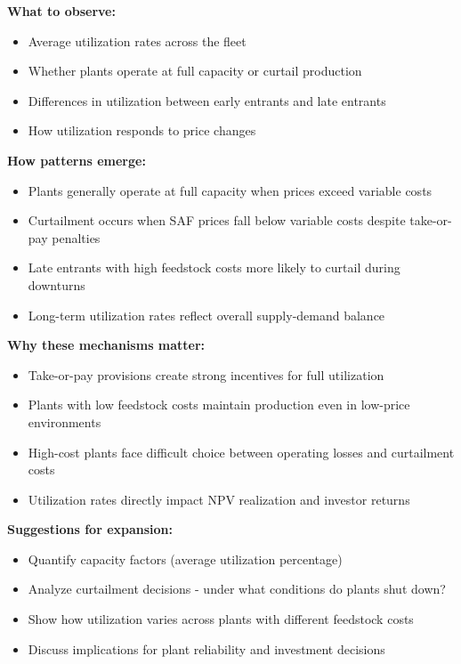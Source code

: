 \documentclass[10.5pt]{article}
\begin{document}
\textbf{What to observe:}
\begin{itemize}
    \item Average utilization rates across the fleet
    \item Whether plants operate at full capacity or curtail production
    \item Differences in utilization between early entrants and late entrants
    \item How utilization responds to price changes
\end{itemize}

\textbf{How patterns emerge:}
\begin{itemize}
    \item Plants generally operate at full capacity when prices exceed variable costs
    \item Curtailment occurs when SAF prices fall below variable costs despite take-or-pay penalties
    \item Late entrants with high feedstock costs more likely to curtail during downturns
    \item Long-term utilization rates reflect overall supply-demand balance
\end{itemize}

\textbf{Why these mechanisms matter:}
\begin{itemize}
    \item Take-or-pay provisions create strong incentives for full utilization
    \item Plants with low feedstock costs maintain production even in low-price environments
    \item High-cost plants face difficult choice between operating losses and curtailment costs
    \item Utilization rates directly impact NPV realization and investor returns
\end{itemize}

\textbf{Suggestions for expansion:}
\begin{itemize}
    \item Quantify capacity factors (average utilization percentage)
    \item Analyze curtailment decisions - under what conditions do plants shut down?
    \item Show how utilization varies across plants with different feedstock costs
    \item Discuss implications for plant reliability and investment decisions
\end{itemize}
\end{document}
